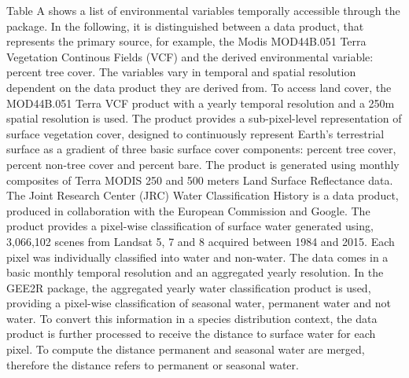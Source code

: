 \documentclass[12pt,twoside,a4paper,final]{report}
\begin{document}
Table A shows a list of environmental variables temporally accessible through the package. In the following, it is distinguished between a data product, that represents the primary source, for example, the Modis MOD44B.051 Terra Vegetation Continous Fields (VCF) and the derived environmental variable: percent tree cover.
The variables vary in temporal and spatial resolution dependent on the data product they are derived from. 
To access land cover, the MOD44B.051 Terra VCF product with a yearly temporal resolution and a 250m spatial resolution is used. The product provides a sub-pixel-level representation of surface vegetation cover, designed to continuously represent Earth's terrestrial surface as a gradient of three basic surface cover components: percent tree cover, percent non-tree cover and percent bare. The product is generated using monthly composites of Terra MODIS 250 and 500 meters Land Surface Reflectance data.
The Joint Research Center (JRC) Water Classification History is a data product, produced in collaboration with the European Commission and Google. The product provides a pixel-wise classification of surface water generated using, 3,066,102 scenes from Landsat 5, 7 and 8 acquired between 1984 and 2015. Each pixel was individually classified into water and non-water. The data comes in a basic monthly temporal resolution and an aggregated yearly resolution. In the GEE2R package, the aggregated yearly water classification product is used, providing a pixel-wise classification of seasonal water, permanent water and not water. To convert this information in a species distribution context, the data product is further processed to receive the distance to surface water for each pixel. To compute the distance permanent and seasonal water are merged, therefore the distance refers to permanent or seasonal water.
\end{document}
